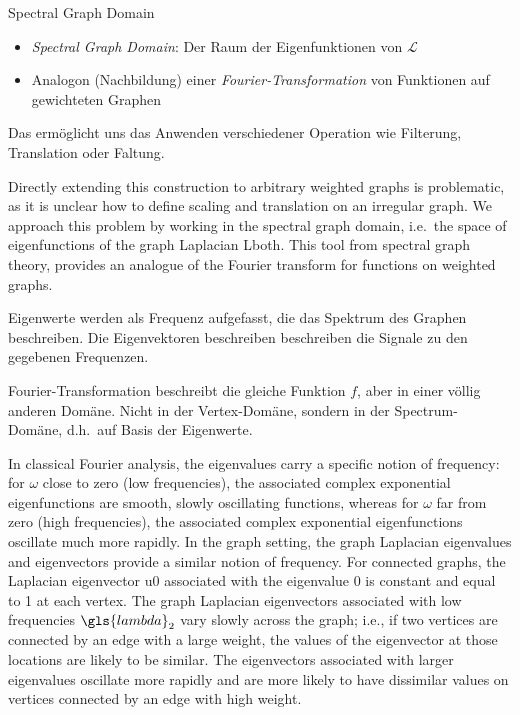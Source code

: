 
Spectral Graph Domain

\begin{itemize}
  \item \emph{Spectral Graph Domain}: Der Raum der Eigenfunktionen von $\mathcal{L}$
  \item Analogon (Nachbildung) einer \emph{Fourier-Transformation} von Funktionen auf gewichteten Graphen
\end{itemize}

Das ermöglicht uns das Anwenden verschiedener Operation wie Filterung, Translation oder Faltung.

Directly extending this construction to arbitrary weighted graphs is problematic, as it is unclear
how to define scaling and translation on an irregular graph.
We approach this problem by working in the spectral graph domain, i.e.\ the space of eigenfunctions of the graph Laplacian \gls{Lboth}.
This tool from spectral graph theory, provides an analogue of the Fourier transform for functions on weighted graphs.

Eigenwerte werden als Frequenz aufgefasst, die das Spektrum des Graphen beschreiben.
Die Eigenvektoren beschreiben beschreiben die Signale zu den gegebenen Frequenzen.

Fourier-Transformation beschreibt die gleiche Funktion $f$, aber in einer völlig anderen Domäne.
Nicht in der Vertex-Domäne, sondern in der Spectrum-Domäne, d.h.\ auf Basis der Eigenwerte.

In classical Fourier analysis, the eigenvalues carry a specific notion of frequency:
for $\omega$ close
to zero (low frequencies), the associated complex exponential
eigenfunctions are smooth, slowly oscillating functions,
whereas for $\omega$ far from zero (high frequencies), the associated
complex exponential eigenfunctions oscillate much more
rapidly. In the graph setting, the graph Laplacian eigenvalues
and eigenvectors provide a similar notion of frequency. For
connected graphs, the Laplacian eigenvector u0 associated
with the eigenvalue 0 is constant and equal to 1
at each
vertex. The graph Laplacian eigenvectors associated with low
frequencies $\gls{lambda}_2$ vary slowly across the graph; i.e., if two
vertices are connected by an edge with a large weight, the
values of the eigenvector at those locations are likely to be
similar. The eigenvectors associated with larger eigenvalues
oscillate more rapidly and are more likely to have dissimilar
values on vertices connected by an edge with high weight.


